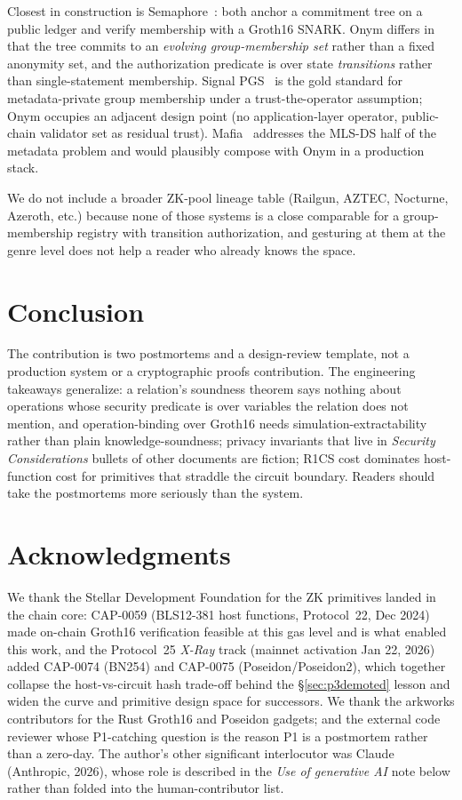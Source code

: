 \documentclass[11pt,a4paper]{article}
\begin{document}
Closest in construction is Semaphore~\cite{semaphore}: both anchor a commitment tree on a public ledger and verify membership with a Groth16 SNARK. Onym differs in that the tree commits to an \emph{evolving group-membership set} rather than a fixed anonymity set, and the authorization predicate is over state \emph{transitions} rather than single-statement membership. Signal PGS~\cite{chase2020} is the gold standard for metadata-private group membership under a trust-the-operator assumption; Onym occupies an adjacent design point (no application-layer operator, public-chain validator set as residual trust). Mafia~\cite{mafia2025} addresses the MLS-DS half of the metadata problem and would plausibly compose with Onym in a production stack.

We do not include a broader ZK-pool lineage table (Railgun, AZTEC, Nocturne, Azeroth, etc.) because none of those systems is a close comparable for a group-membership registry with transition authorization, and gesturing at them at the genre level does not help a reader who already knows the space.

\section{Conclusion}

The contribution is two postmortems and a design-review template, not a production system or a cryptographic proofs contribution. The engineering takeaways generalize: a relation's soundness theorem says nothing about operations whose security predicate is over variables the relation does not mention, and operation-binding over Groth16 needs simulation-extractability rather than plain knowledge-soundness; privacy invariants that live in \emph{Security Considerations} bullets of other documents are fiction; R1CS cost dominates host-function cost for primitives that straddle the circuit boundary. Readers should take the postmortems more seriously than the system.

\section*{Acknowledgments}

We thank the Stellar Development Foundation for the ZK primitives landed in the chain core: CAP-0059 (BLS12-381 host functions, Protocol~22, Dec 2024) made on-chain Groth16 verification feasible at this gas level and is what enabled this work, and the Protocol~25 \emph{X-Ray} track (mainnet activation Jan 22, 2026) added CAP-0074 (BN254) and CAP-0075 (Poseidon/Poseidon2), which together collapse the host-vs-circuit hash trade-off behind the \S\ref{sec:p3demoted} lesson and widen the curve and primitive design space for successors. We thank the arkworks contributors for the Rust Groth16 and Poseidon gadgets; and the external code reviewer whose P1-catching question is the reason P1 is a postmortem rather than a zero-day. The author's other significant interlocutor was Claude (Anthropic, 2026), whose role is described in the \emph{Use of generative AI} note below rather than folded into the human-contributor list.
\end{document}
